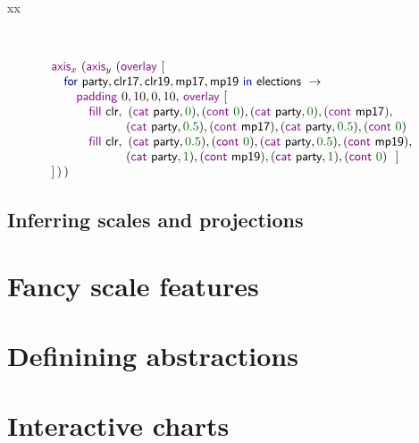 \documentclass{jfp}
\newcommand{\num}[1]{\textcolor{numclr}{#1}}
\newcommand{\ident}[1]{\textnormal{\textcolor{idclr}{\sffamily #1}}}
\newcommand{\kvd}[1]{\textnormal{\textcolor{kvdclr}{\sffamily #1}}}
\newcommand{\fkvd}[1]{\textnormal{\textcolor{fkvdclr}{\sffamily #1}}}
\begin{document}
~

xx

~


\begin{equation*}
\begin{array}{l}
  \kvd{axis}_x~(\kvd{axis}_y~(\kvd{overlay}~[\\
  \quad \fkvd{for}~\ident{party}, \ident{clr17}, \ident{clr19}, \ident{mp17}, \ident{mp19}~\fkvd{in}~\ident{elections}~\rightarrow\\
  \quad\quad \kvd{padding}~0,10,0,10,\,\kvd{overlay}~[\\
  \quad\quad\quad \kvd{fill}~\ident{clr},~(\kvd{cat}~\ident{party}, \num{0}), (\kvd{cont}~\num{0}), (\kvd{cat}~\ident{party}, \num{0}), (\kvd{cont}~\ident{mp17}),\\
  \quad\quad\quad \hspace{2.65em}           ~(\kvd{cat}~\ident{party}, \num{0.5}), (\kvd{cont}~\ident{mp17}), (\kvd{cat}~\ident{party}, \num{0.5}), (\kvd{cont}~\num{0})\\
  \quad\quad\quad \kvd{fill}~\ident{clr},~(\kvd{cat}~\ident{party}, \num{0.5}), (\kvd{cont}~\num{0}), (\kvd{cat}~\ident{party}, \num{0.5}), (\kvd{cont}~\ident{mp19}),\\
  \quad\quad\quad \hspace{2.65em}           ~(\kvd{cat}~\ident{party}, \num{1}), (\kvd{cont}~\ident{mp19}), (\kvd{cat}~\ident{party}, \num{1}), (\kvd{cont}~\num{0})~~]\\
  ]\,)\,)
\end{array}
\end{equation*}


\subsection{Inferring scales and projections}

\section{Fancy scale features}

\section{Definining abstractions}

\section{Interactive charts}
\end{document}
